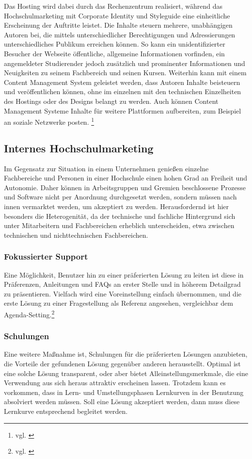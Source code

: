 Das Hosting wird dabei durch das Rechenzentrum realisiert, während das Hochschulmarketing mit Corporate Identity und Styleguide eine einheitliche Erscheinung der Auftritte leistet. Die Inhalte steuern mehrere, unabhängigen Autoren bei, die mittels unterschiedlicher Berechtigungen und Adressierungen unterschiedliches Publikum erreichen können.
So kann ein unidentifizierter Besucher der Webseite öffentliche, allgemeine Informationen vorfinden, ein angemeldeter Studierender jedoch zusätzlich und prominenter Informationen und Neuigkeiten zu seinem Fachbereich und seinen Kursen.
Weiterhin kann mit einem Content Management System geleistet werden, dass Autoren Inhalte beisteuern und veröffentlichen können, ohne im einzelnen mit den technischen Einzelheiten des Hostings oder des Designs belangt zu werden. Auch können Content Management Systeme Inhalte für weitere Plattformen aufbereiten, zum Beispiel an soziale Netzwerke posten. \footnote{vgl. \cite{content_management_system_patent}}

\subsection{Internes Hochschulmarketing}
\label{subsection_internes_hochschulemarketing}
Im Gegensatz zur Situation in einem Unternehmen genießen einzelne Fachbereiche und Personen in einer Hochschule einen hohen Grad an Freiheit und Autonomie. Daher können in Arbeitsgruppen und Gremien beschlossene Prozesse und Software nicht per Anordnung durchgesetzt werden, sondern müssen nach innen vermarktet werden, um akzeptiert zu werden. Herausfordernd ist hier besonders die Heterogenität, da der technische und fachliche Hintergrund sich unter Mitarbeitern und Fachbereichen erheblich unterscheiden, etwa zwischen technischen und nichttechnischen Fachbereichen.

\subsubsection{Fokussierter Support}
Eine Möglichkeit, Benutzer hin zu einer präferierten Lösung zu leiten ist diese in Präferenzen, Anleitungen und FAQs an erster Stelle und in höherem Detailgrad zu präsentieren. Vielfach wird eine Voreinstellung einfach übernommen, und die erste Lösung zu einer Fragestellung als Referenz angesehen, vergleichbar dem Agenda-Setting.\footnote{vgl. \cite{bonfadelli_medienwirkungsforschung_2015}}

\subsubsection{Schulungen}
Eine weitere Maßnahme ist, Schulungen für die präferierten Lösungen anzubieten, die Vorteile der gefundenen Lösung gegenüber anderen herausstellt. Optimal ist eine solche Lösung transparent, oder aber bietet Alleinstellungsmerkmale, die eine Verwendung aus sich heraus attraktiv erscheinen lassen. Trotzdem kann es vorkommen, dass in Lern- und Umstellungsphasen Lernkurven in der Benutzung absolviert werden müssen. Soll eine Lösung akzeptiert werden, dann muss diese Lernkurve entsprechend begleitet werden.

